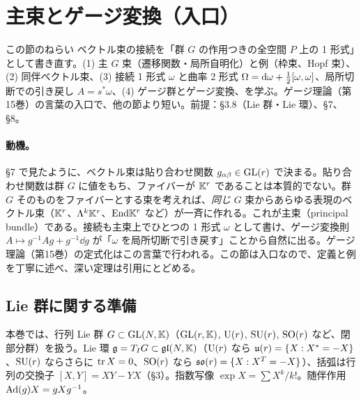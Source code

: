 \section{主束とゲージ変換（入口）}
\label{C:sec9}
\begin{goalbox}{この節のねらい}
ベクトル束の接続を「群 $G$ の作用つきの全空間 $P$ 上の 1 形式」として書き直す。(1) 主 $G$ 束（遷移関数・局所自明化）と例（枠束、Hopf 束）、(2) 同伴ベクトル束、(3) 接続 1 形式 $\omega$ と曲率 2 形式 $\Omega=\mathrm{d}\omega+\frac12[\omega,\omega]$、局所切断での引き戻し $A=s^*\omega$、(4) ゲージ群とゲージ変換、を学ぶ。ゲージ理論（第15巻）の言葉の入口で、他の節より短い。前提：§3.8（Lie 群・Lie 環）、§7、§8。
\end{goalbox}

\paragraph{動機。}§7 で見たように、ベクトル束は貼り合わせ関数 $g_{\alpha\beta}\in\mathrm{GL}(r)$ で決まる。貼り合わせ関数は群 $G$ に値をもち、ファイバーが $\mathbb K^r$ であることは本質的でない。群 $G$ そのものをファイバーとする束を考えれば、\emph{同じ} $G$ 束からあらゆる表現のベクトル束（$\mathbb K^r$、$\Lambda^k\mathbb K^r$、$\mathrm{End}\mathbb K^r$ など）が一斉に作れる。これが主束（principal bundle）である。接続も主束上でひとつの 1 形式 $\omega$ として書け、ゲージ変換則 $A\mapsto g^{-1}Ag+g^{-1}\dd g$ が「$\omega$ を局所切断で引き戻す」ことから自然に出る。ゲージ理論（第15巻）の定式化はこの言葉で行われる。この節は入口なので、定義と例を丁寧に述べ、深い定理は引用にとどめる。

\subsection{Lie 群に関する準備}
本巻では、行列 Lie 群 $G\subset\mathrm{GL}(N,\mathbb K)$（$\mathrm{GL}(r,\mathbb K)$, $\mathrm{U}(r)$, $\mathrm{SU}(r)$, $\mathrm{SO}(r)$ など、閉部分群）を扱う。Lie 環 $\mathfrak g=T_IG\subset\mathfrak{gl}(N,\mathbb K)$（$\mathrm{U}(r)$ なら $\mathfrak{u}(r)=\{X:X^*=-X\}$、$\mathrm{SU}(r)$ ならさらに $\operatorname{tr} X=0$、$\mathrm{SO}(r)$ なら $\mathfrak{so}(r)=\{X:X^T=-X\}$）、括弧は行列の交換子 $[X,Y]=XY-YX$（§3）。指数写像 $\exp X=\sum X^k/k!$。随伴作用 $\mathrm{Ad}(g)X=gXg^{-1}$。

